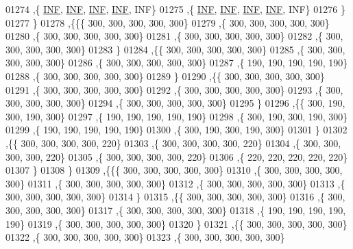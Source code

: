 \begin{DoxyCode}
01274    ,\{   \hyperlink{energy__const_8h_a12c2040f25d8e3a7b9e1c2024c618cb6}{INF},   \hyperlink{energy__const_8h_a12c2040f25d8e3a7b9e1c2024c618cb6}{INF},   \hyperlink{energy__const_8h_a12c2040f25d8e3a7b9e1c2024c618cb6}{INF},   \hyperlink{energy__const_8h_a12c2040f25d8e3a7b9e1c2024c618cb6}{INF},   INF\}
01275    ,\{   \hyperlink{energy__const_8h_a12c2040f25d8e3a7b9e1c2024c618cb6}{INF},   \hyperlink{energy__const_8h_a12c2040f25d8e3a7b9e1c2024c618cb6}{INF},   \hyperlink{energy__const_8h_a12c2040f25d8e3a7b9e1c2024c618cb6}{INF},   \hyperlink{energy__const_8h_a12c2040f25d8e3a7b9e1c2024c618cb6}{INF},   INF\}
01276    \}
01277   \}
01278  ,\{\{\{   300,   300,   300,   300,   300\}
01279    ,\{   300,   300,   300,   300,   300\}
01280    ,\{   300,   300,   300,   300,   300\}
01281    ,\{   300,   300,   300,   300,   300\}
01282    ,\{   300,   300,   300,   300,   300\}
01283    \}
01284   ,\{\{   300,   300,   300,   300,   300\}
01285    ,\{   300,   300,   300,   300,   300\}
01286    ,\{   300,   300,   300,   300,   300\}
01287    ,\{   190,   190,   190,   190,   190\}
01288    ,\{   300,   300,   300,   300,   300\}
01289    \}
01290   ,\{\{   300,   300,   300,   300,   300\}
01291    ,\{   300,   300,   300,   300,   300\}
01292    ,\{   300,   300,   300,   300,   300\}
01293    ,\{   300,   300,   300,   300,   300\}
01294    ,\{   300,   300,   300,   300,   300\}
01295    \}
01296   ,\{\{   300,   190,   300,   190,   300\}
01297    ,\{   190,   190,   190,   190,   190\}
01298    ,\{   300,   190,   300,   190,   300\}
01299    ,\{   190,   190,   190,   190,   190\}
01300    ,\{   300,   190,   300,   190,   300\}
01301    \}
01302   ,\{\{   300,   300,   300,   300,   220\}
01303    ,\{   300,   300,   300,   300,   220\}
01304    ,\{   300,   300,   300,   300,   220\}
01305    ,\{   300,   300,   300,   300,   220\}
01306    ,\{   220,   220,   220,   220,   220\}
01307    \}
01308   \}
01309  ,\{\{\{   300,   300,   300,   300,   300\}
01310    ,\{   300,   300,   300,   300,   300\}
01311    ,\{   300,   300,   300,   300,   300\}
01312    ,\{   300,   300,   300,   300,   300\}
01313    ,\{   300,   300,   300,   300,   300\}
01314    \}
01315   ,\{\{   300,   300,   300,   300,   300\}
01316    ,\{   300,   300,   300,   300,   300\}
01317    ,\{   300,   300,   300,   300,   300\}
01318    ,\{   190,   190,   190,   190,   190\}
01319    ,\{   300,   300,   300,   300,   300\}
01320    \}
01321   ,\{\{   300,   300,   300,   300,   300\}
01322    ,\{   300,   300,   300,   300,   300\}
01323    ,\{   300,   300,   300,   300,   300\}

\end{DoxyCode}
